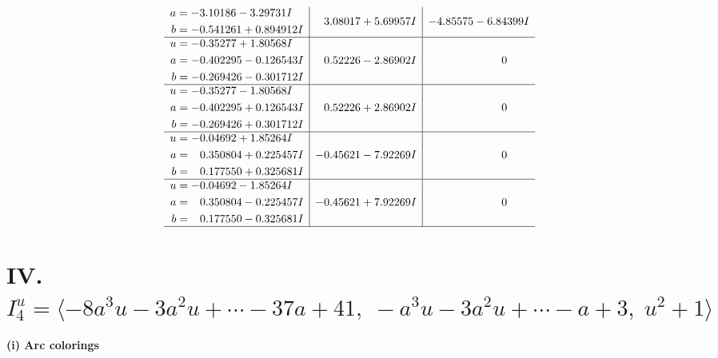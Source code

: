 \documentclass[1p]{elsarticle_modified}
\theoremstyle{definition}
\begin{document}
$$\begin{array}{c|c|c}
\begin{aligned}
a &= -3.10186 - 3.29731 I \\
b &= -0.541261 + 0.894912 I\end{aligned}
 & \phantom{-}3.08017 + 5.69957 I & -4.85575 - 6.84399 I \\ \hline\begin{aligned}
u &= -0.35277 + 1.80568 I \\
a &= -0.402295 - 0.126543 I \\
b &= -0.269426 - 0.301712 I\end{aligned}
 & \phantom{-}0.52226 - 2.86902 I & \phantom{-0.000000 } 0 \\ \hline\begin{aligned}
u &= -0.35277 - 1.80568 I \\
a &= -0.402295 + 0.126543 I \\
b &= -0.269426 + 0.301712 I\end{aligned}
 & \phantom{-}0.52226 + 2.86902 I & \phantom{-0.000000 } 0 \\ \hline\begin{aligned}
u &= -0.04692 + 1.85264 I \\
a &= \phantom{-}0.350804 + 0.225457 I \\
b &= \phantom{-}0.177550 + 0.325681 I\end{aligned}
 & -0.45621 - 7.92269 I & \phantom{-0.000000 } 0 \\ \hline\begin{aligned}
u &= -0.04692 - 1.85264 I \\
a &= \phantom{-}0.350804 - 0.225457 I \\
b &= \phantom{-}0.177550 - 0.325681 I\end{aligned}
 & -0.45621 + 7.92269 I & \phantom{-0.000000 } 0\\
 \hline 
 \end{array}$$\newpage\newpage\renewcommand{\arraystretch}{1}
\centering \section*{IV. $I^u_{4}= \langle -8 a^3 u-3 a^2 u+\cdots-37 a+41,\;- a^3 u-3 a^2 u+\cdots- a+3,\;u^2+1 \rangle$}
\flushleft \textbf{(i) Arc colorings}\\
\end{document}
